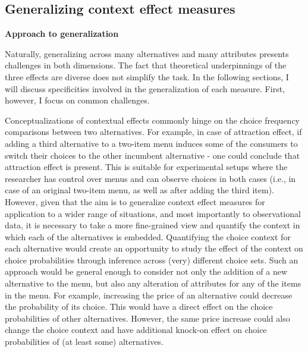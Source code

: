 \documentclass[a4paper,12pt]{article}
\begin{document}
\subsection{Generalizing context effect measures}
\textbf{Approach to generalization}

Naturally, generalizing across many alternatives and many attributes presents challenges in both dimensions. The fact that theoretical underpinnings of the three effects are diverse does not simplify the task. In the following sections, I will discuss specificities involved in the generalization of each measure. First, however, I focus on common challenges.

Conceptualizations of contextual effects commonly hinge on the choice frequency comparisons between two alternatives. For example, in case of attraction effect, if adding a third alternative to a two-item menu induces some of the consumers to switch their choices to the other incumbent alternative - one could conclude that attraction effect is present. This is suitable for experimental setups where the researcher has control over menus and can observe choices in both cases (i.e., in case of an original two-item menu, as well as after adding the third item). However, given that the aim is to generalize context effect measures for application to a wider range of situations, and most importantly to observational data, it is necessary to take a more fine-grained view and quantify the context in which each of the alternatives is embedded. Quantifying the choice context for each alternative would create an opportunity to study the effect of the context on choice probabilities through inference across (very) different choice sets. Such an approach would be general enough to consider not only the addition of a new alternative to the menu, but also any alteration of attributes for any of the items in the menu. For example, increasing the price of an alternative could decrease the probability of its choice. This would have a direct effect on the choice probabilities of other alternatives. However, the same price increase could also change the choice context and have additional knock-on effect on choice probabilities of (at least some) alternatives.
\end{document}

